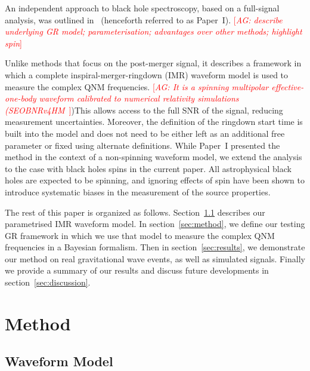 \documentclass[twocolumn,prd,superscriptaddress,amsfonts,amssymb,amsmath,preprintnumbers]{revtex4-1}
\newcommand{\paperone}{Paper~I\xspace}
\newcommand{\abhi}[1]{\textcolor{red}{[\textit{AG: #1}]}}
\begin{document}
\par
An independent approach to black hole spectroscopy, based on a full-signal analysis, was outlined in~\citep{Brito:2018rfr} (henceforth referred to as \paperone). \abhi{describe underlying GR model; parameterisation; advantages over other methods; highlight spin} 



Unlike methods that focus on the post-merger signal, it describes a framework in which a complete inspiral-merger-ringdown (IMR) waveform model is used to measure the complex QNM frequencies. \abhi{It is a spinning multipolar effective-one-body waveform calibrated to numerical relativity simulations (SEOBNRv4HM~\citep{Cotesta:2018fcv}})This allows access to the full SNR of the signal, reducing measurement uncertainties. Moreover, the definition of the ringdown start time is built into the model and does not need to be either left as an additional free parameter or fixed using alternate definitions. While \paperone presented the method in the context of a non-spinning waveform model, we extend the analysis to the case with black holes spins in the current paper. All astrophysical black holes are expected to be spinning, and ignoring effects of spin have been shown to introduce systematic biases in the measurement of the source properties.
\par
The rest of this paper is organized as follows. Section~\ref{sec:model} describes our parametrised IMR waveform model. In section~\ref{sec:method}, we define our testing GR framework in which we use that model to measure the complex QNM frequencies in a Bayesian formalism. Then in section~\ref{sec:results}, we demonstrate our method on real gravitational wave events, as well as simulated signals. Finally we provide a summary of our results and discuss future developments in section~\ref{sec:discussion}.

\section{Method}
\subsection{Waveform Model}\label{sec:model}


\end{document}
